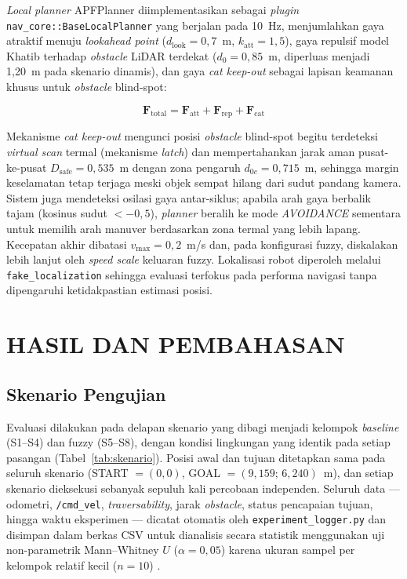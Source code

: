 \documentclass[10pt,twocolumn]{article}
\begin{document}
\textit{Local planner} APFPlanner diimplementasikan sebagai \textit{plugin} \texttt{nav\_core::BaseLocalPlanner} yang berjalan pada 10~Hz, menjumlahkan gaya atraktif menuju \textit{lookahead point} ($d_\text{look}=0{,}7$~m, $k_\text{att}=1{,}5$), gaya repulsif model Khatib \cite{Khatib1986} terhadap \textit{obstacle} LiDAR terdekat ($d_0=0{,}85$~m, diperluas menjadi 1,20~m pada skenario dinamis), dan gaya \textit{cat keep-out} sebagai lapisan keamanan khusus untuk \textit{obstacle} blind-spot:

\begin{equation}
\mathbf{F}_\text{total}=\mathbf{F}_\text{att}+\mathbf{F}_\text{rep}+\mathbf{F}_\text{cat}
\label{eq:f_total}
\end{equation}

Mekanisme \textit{cat keep-out} mengunci posisi \textit{obstacle} blind-spot begitu terdeteksi \textit{virtual scan} termal (mekanisme \textit{latch}) dan mempertahankan jarak aman pusat-ke-pusat $D_\text{safe}=0{,}535$~m dengan zona pengaruh $d_{0c}=0{,}715$~m, sehingga margin keselamatan tetap terjaga meski objek sempat hilang dari sudut pandang kamera. Sistem juga mendeteksi osilasi gaya antar-siklus; apabila arah gaya berbalik tajam (kosinus sudut $<-0{,}5$), \textit{planner} beralih ke mode \textit{AVOIDANCE} sementara untuk memilih arah manuver berdasarkan zona termal yang lebih lapang. Kecepatan akhir dibatasi $v_\text{max}=0{,}2$~m/s dan, pada konfigurasi fuzzy, diskalakan lebih lanjut oleh \textit{speed scale} keluaran fuzzy. Lokalisasi robot diperoleh melalui \texttt{fake\_localization} sehingga evaluasi terfokus pada performa navigasi tanpa dipengaruhi ketidakpastian estimasi posisi.

\section{HASIL DAN PEMBAHASAN}

\subsection{Skenario Pengujian}

Evaluasi dilakukan pada delapan skenario yang dibagi menjadi kelompok \textit{baseline} (S1--S4) dan fuzzy (S5--S8), dengan kondisi lingkungan yang identik pada setiap pasangan (Tabel~\ref{tab:skenario}). Posisi awal dan tujuan ditetapkan sama pada seluruh skenario (START $=(0,0)$, GOAL $=(9{,}159;\,6{,}240)$~m), dan setiap skenario dieksekusi sebanyak sepuluh kali percobaan independen. Seluruh data --- odometri, \texttt{/cmd\_vel}, \textit{traversability}, jarak \textit{obstacle}, status pencapaian tujuan, hingga waktu eksperimen --- dicatat otomatis oleh \texttt{experiment\_logger.py} dan disimpan dalam berkas CSV untuk dianalisis secara statistik menggunakan uji non-parametrik Mann--Whitney $U$ ($\alpha=0{,}05$) karena ukuran sampel per kelompok relatif kecil ($n=10$) \cite{Adiuku2024}.
\end{document}

